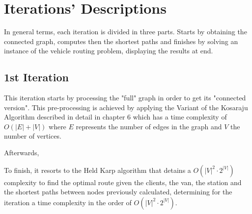 \chapter{Iterations' Descriptions} \label{iterations}

In general terms, each iteration is divided in three parts. Starts by obtaining the connected graph, computes then the shortest paths and finishes by solving an instance of the vehicle routing problem, displaying the results at end.

\section{1st Iteration}
This iteration starts by processing the "full" graph in order to get its "connected version". This pre-processing is achieved by applying the Variant of the Kosaraju Algorithm described in detail in chapter 6 which has a time complexity of $O(|E| + |V|)$ where $E$ represents the number of edges in the graph and $V$ the number of vertices.\par

Afterwards,
\par
To finish, it resorts to the Held Karp algorithm that detains a $O(|V|^2 \cdot 2^{|V|})$ complexity to find the optimal route given the clients, the van, the station and the shortest paths between nodes previously calculated, determining for the iteration a time complexity in the order of $O(|V|^2 \cdot 2^{|V|})$.


